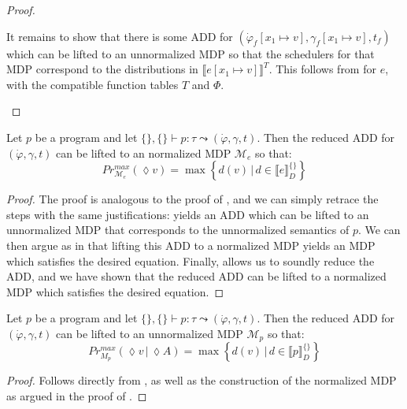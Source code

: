 \begin{proof}
\begin{itemize}
		It remains to show that there is some ADD for $(\dot{\varphi}_f[x_1\mapsto v], \gamma_f[x_1\mapsto v], t_f)$ which can be lifted to an unnormalized MDP so that the schedulers for that MDP correspond to the distributions in $\llbracket e[x_1\mapsto v]\rrbracket^T$.
		This follows from  for $e$, with the compatible function tables $T$ and $\Phi$.
	\end{itemize}
\end{proof}


\begin{lemma}\label{ProgramSoundnessProof}
	Let $p$ be a \NDICE program  
	and  let $\{\}, \{\} \vdash p \colon \tau \leadsto (\dot{\varphi}, \gamma, t)$. 
	Then the reduced ADD for $(\dot{\varphi}, \gamma, t)$ can be lifted to an normalized MDP $\mathcal{M}_e$ so that:
	$$ Pr^{max}_{\mathcal{M}_e} (\lozenge v) = \max \left\{d(v) \,|\, d \in \llbracket e\rrbracket^{\{\}}_D \right\}$$
\end{lemma}
\begin{proof}
	The proof is analogous to the proof of , and we can simply retrace the steps with the same justifications:
	 yields an ADD which can be lifted to an unnormalized MDP that corresponds to the unnormalized semantics of $p$. 
	We can then argue as in  that lifting this ADD to a normalized MDP yields an MDP which satisfies the desired equation.
	Finally,  allows us to soundly reduce the ADD, and we have shown that the reduced ADD can be lifted to a normalized MDP which satisfies the desired equation.
\end{proof}


\begin{theorem}\label{app:ProgramSoundness}
	Let $p$ be a \NDICE program  
	and let $\{\}, \{\} \vdash p \colon \tau \leadsto (\dot{\varphi}, \gamma, t)$. 
	Then the reduced ADD for $(\dot{\varphi}, \gamma, t)$ can be lifted to an unnormalized MDP $\mathcal{M}_p$ so that:
	$$ Pr^{max}_{M_p} (\lozenge v \,|\, \lozenge A) = \max \left\{d(v) \,|\, d \in \llbracket p\rrbracket^{\{\}}_D\right\}$$
\end{theorem}
\begin{proof}
	Follows directly from , as well as the construction of the normalized MDP as argued in the proof of .
\end{proof}






